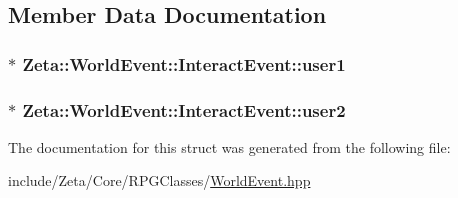 \subsection{Member Data Documentation}
\hypertarget{structZeta_1_1WorldEvent_1_1InteractEvent_a14b39bc56740da876999b43dbef4ab07}{
\subsubsection[{user1}]{$\ast$ Zeta\+::\+World\+Event\+::\+Interact\+Event\+::user1}}\label{structZeta_1_1WorldEvent_1_1InteractEvent_a14b39bc56740da876999b43dbef4ab07}
\hypertarget{structZeta_1_1WorldEvent_1_1InteractEvent_a23b10dc79715de1a0b40df45181b804b}{
\subsubsection[{user2}]{$\ast$ Zeta\+::\+World\+Event\+::\+Interact\+Event\+::user2}}\label{structZeta_1_1WorldEvent_1_1InteractEvent_a23b10dc79715de1a0b40df45181b804b}


The documentation for this struct was generated from the following file\+:\begin{DoxyCompactItemize}
\item 
include/\+Zeta/\+Core/\+R\+P\+G\+Classes/\hyperlink{WorldEvent_8hpp}{World\+Event.\+hpp}\end{DoxyCompactItemize}
